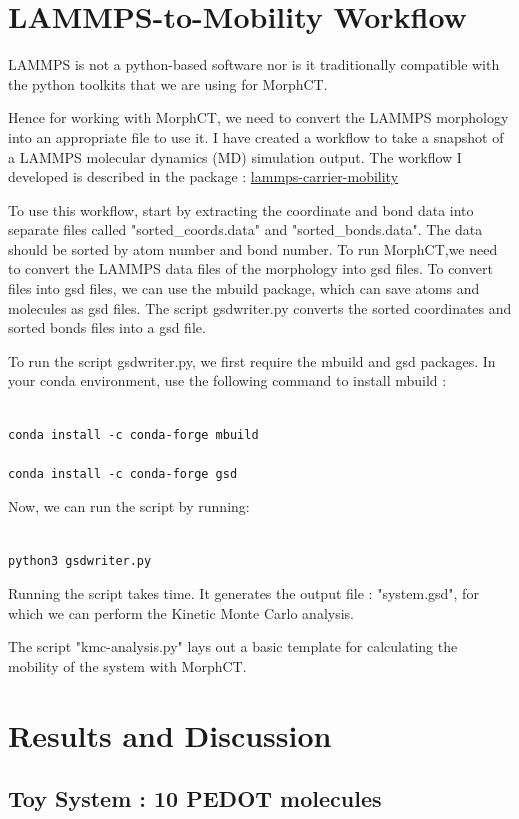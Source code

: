 \documentclass{article}
\begin{document}
\section{LAMMPS-to-Mobility Workflow}

LAMMPS is not a python-based software nor is it traditionally compatible with the python toolkits that we are using for MorphCT.

Hence for working with MorphCT, we need to convert the LAMMPS morphology into an appropriate file to use it. I have created a workflow to take a snapshot of a LAMMPS molecular dynamics (MD) simulation output. The workflow I developed is described in the package : \href{https://github.com/chemicalfiend/lammps-carrier-mobility}{lammps-carrier-mobility}

To use this workflow, start by extracting the coordinate and bond data into separate files called "sorted\_coords.data" and "sorted\_bonds.data". The data should be sorted by atom number and bond number. To run MorphCT,we need to convert the LAMMPS data files of the morphology into gsd files. To convert files into gsd files, we can use the mbuild package, which can save atoms and molecules as gsd files. The script gsdwriter.py converts the sorted coordinates and sorted bonds files into a gsd file. 

To run the script gsdwriter.py, we first require the mbuild and gsd packages. In your conda environment, use the following command to install mbuild :

\begin{lstlisting}

conda install -c conda-forge mbuild

conda install -c conda-forge gsd

\end{lstlisting}

Now, we can run the script by running:

\begin{lstlisting}

python3 gsdwriter.py

\end{lstlisting}


Running the script takes time. It generates the output file : "system.gsd", for which we can perform the Kinetic Monte Carlo analysis.

The script "kmc-analysis.py" lays out a basic template for calculating the mobility of the system with MorphCT.


\section{Results and Discussion}

\subsection{Toy System : 10 PEDOT molecules}


\end{document}
